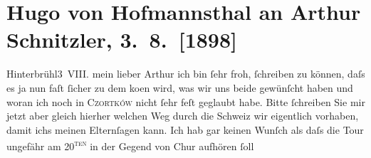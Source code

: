 

         
         \renewcommand{\erwaehntePersonen}{Personen: Hugo August von Hofmannsthal, Anna von Hofmannsthal}
         \renewcommand{\erwaehnteOrte}{Orte: Chur, Hinterbrühl, Innsbruck, Italien, Maloja, Schweiz, Tegernsee, Tschortkiw}
         \renewcommand{\erwaehnteWerke}{}
               \section[Hugo von Hofmannsthal an Arthur Schnitzler, 3. 8. {[}1898{]}]{ Hugo von Hofmannsthal an Arthur Schnitzler, 3. 8. {[}1898{]}}\nopagebreak{}\rehead{ }\begin{ledgroupsized}[t]{13cm}\normalsize\beginnumbering \toendnotes[C]{\smallbreak\pagebreak[2]} 
\toendnotes[C]{\smallbreak}\pstart
           \raggedleft{}{\pb}Hinterbrühl3 VIII.\pend
           \pstart{}mein lieber Arthur\pend\pstart
           ich bin ſehr froh, ſchreiben zu können, daſs es ja nun faſt ſicher zu dem ko{\geminationm}en wird, was wir uns beide gewünſcht haben und
                    woran ich noch in \textsc{Czortków} nicht ſehr feſt geglaubt habe.\pend
           \pstart
           Bitte ſchreiben Sie mir jetzt {\pb}aber gleich hierher welchen Weg durch die Schweiz wir eigentlich vorhaben, damit ichs meinen Elternſagen kann. Ich hab gar keinen Wunſch als daſs die Tour
                    ungefähr am 20\textsuperscript{\textsc{ten}} in der Gegend von Chur aufhören ſoll

\end{ledgroupsized}
